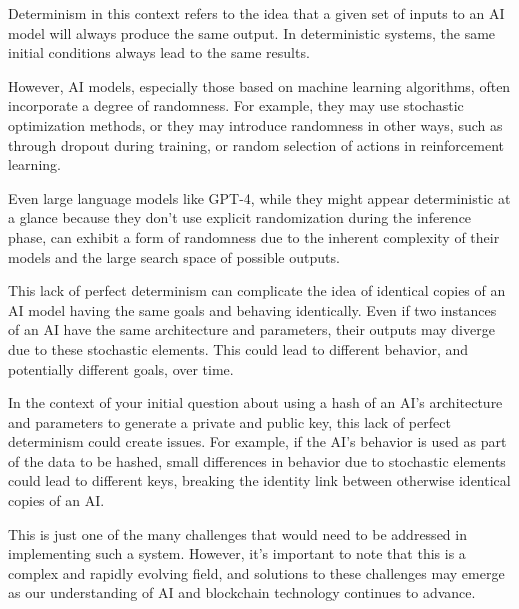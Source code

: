 \documentclass{article}[10pt]
\begin{document}
Determinism in this context refers to the idea that a given set of inputs to an AI model will always produce the same output. 
In deterministic systems, the same initial conditions always lead to the same results.\par

However, AI models, especially those based on machine learning algorithms, often incorporate a degree of randomness. 
For example, they may use stochastic optimization methods, or they may introduce randomness in other ways, such as through dropout during training, or random selection of actions in reinforcement learning.\par

Even large language models like GPT-4, while they might appear deterministic at a glance because they don't use explicit randomization during the inference phase, can exhibit a form of randomness due to the inherent complexity of their models and the large search space of possible outputs.\par

This lack of perfect determinism can complicate the idea of identical copies of an AI model having the same goals and behaving identically. 
Even if two instances of an AI have the same architecture and parameters, their outputs may diverge due to these stochastic elements. 
This could lead to different behavior, and potentially different goals, over time.\par

In the context of your initial question about using a hash of an AI's architecture and parameters to generate a private and public key, this lack of perfect determinism could create issues.
For example, if the AI's behavior is used as part of the data to be hashed, small differences in behavior due to stochastic elements could lead to different keys, breaking the identity link between otherwise identical copies of an AI.\par

This is just one of the many challenges that would need to be addressed in implementing such a system. 
However, it's important to note that this is a complex and rapidly evolving field, and solutions to these challenges may emerge as our understanding of AI and blockchain technology continues to advance.\\
\end{document}

